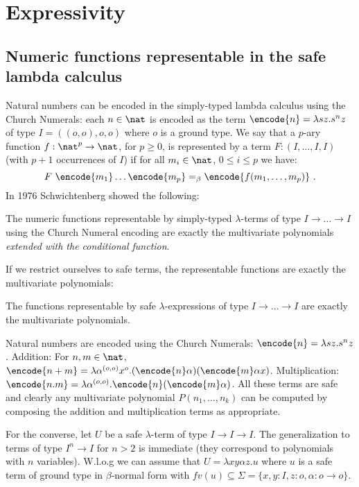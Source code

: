 \allowdisplaybreaks

\section{Expressivity}
\subsection{Numeric functions representable in the safe lambda
calculus}

Natural numbers can be encoded in the simply-typed lambda calculus
using the Church Numerals: each $n\in\nat$ is encoded as the term
$\encode{n} = \lambda s z. s^n z$ of type $I = ((o,o),o,o)$ where
$o$ is a ground type.
We say that a $p$-ary function $f : \nat^p \rightarrow \nat$, for $p \geq 0$,
is represented by a term $F : (I, \ldots, I, I)$ (with $p+1$ occurrences of $I$)
if for all $m_i \in \nat$, $0\leq i\leq p$ we have:
$$F~\encode{m_1} \ldots \encode{m_p} =_\beta \encode{f(m_1,\ldots, m_p)} \ .$$
In 1976 Schwichtenberg \cite{citeulike:622637}
showed the following:


\begin{theorem}[Schwichtenberg 1976]
The numeric functions representable by simply-typed $\lambda$-terms
of type $I\rightarrow \ldots \rightarrow I$ using the Church Numeral
encoding are exactly the multivariate polynomials \emph{extended
with the conditional function}.
\end{theorem}

If we restrict ourselves to safe terms, the representable functions
are exactly the multivariate polynomials:
\begin{theorem}
\label{thm:polychar} The functions representable by safe
$\lambda$-expressions of type $I\rightarrow \ldots \rightarrow I$
are exactly the multivariate polynomials.
\end{theorem}
\proof
  Natural numbers are encoded using the Church Numerals: $\encode{n} =
  \lambda s z. s^n z$.  Addition: For $n,m \in \nat$, $\encode{n+m} =
  \lambda \alpha^{(o,o)} x^o . (\encode{n} \alpha) (\encode{m} \alpha
  x)$. Multiplication: $\encode{n . m} = \lambda \alpha^{(o,o)}
  . \encode{n} (\encode{m} \alpha)$.  All these terms are safe and
  clearly any multivariate polynomial $P(n_1, \ldots, n_k)$ can be
  computed by composing the addition and multiplication terms as
  appropriate.

For the converse, let $U$ be a safe $\lambda$-term of type
$I\rightarrow I\rightarrow I$.  The generalization to terms of type
$I^n \rightarrow I$ for $n>2$ is immediate (they correspond to
polynomials with $n$ variables). W.l.o.g we can assume that $U =
\lambda x y \alpha z. u$ where $u$ is a safe term of ground type in
$\beta$-normal form with $fv(u) \subseteq \Sigma = \{ x, y : I, z :o, \alpha
: o\rightarrow o \}$.

